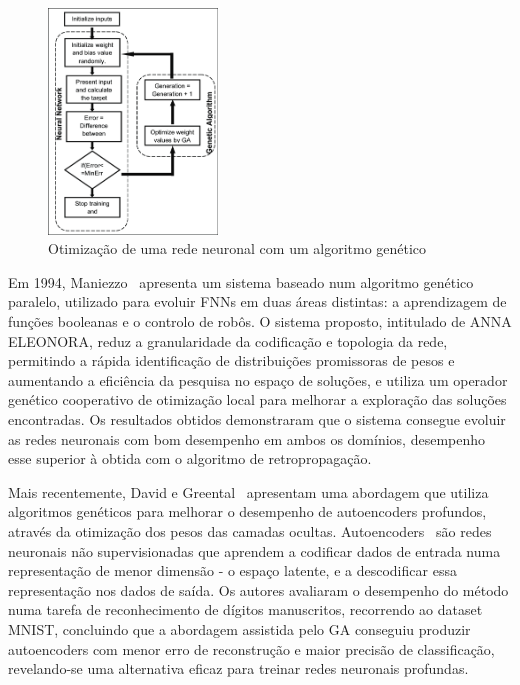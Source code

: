 \begin{figure}[htbp]
    \centering
    \includegraphics[width=0.4\textwidth]{imagens/ga_nn}
    \caption{Otimização de uma rede neuronal com um algoritmo genético~\cite{Rahman2015AnAlgorithms}}
    \label{fig:ga_nn}
\end{figure}

Em 1994, Maniezzo~\cite{Maniezzo1994} apresenta um sistema baseado num algoritmo genético paralelo, utilizado para evoluir FNNs em duas áreas distintas: a aprendizagem de funções booleanas e o controlo de robôs.
O sistema proposto, intitulado de ANNA ELEONORA, reduz a granularidade da codificação e topologia da rede, permitindo a rápida identificação de distribuições promissoras de pesos e aumentando a eficiência da pesquisa no espaço de soluções, e utiliza um operador genético cooperativo de otimização local para melhorar a exploração das soluções encontradas.
Os resultados obtidos demonstraram que o sistema consegue evoluir as redes neuronais com bom desempenho em ambos os domínios, desempenho esse superior à obtida com o algoritmo de retropropagação.

Mais recentemente, David e Greental~\cite{David2014GeneticNetworks} apresentam uma abordagem que utiliza algoritmos genéticos para melhorar o desempenho de autoencoders profundos, através da otimização dos pesos das camadas ocultas.
Autoencoders~\cite{Pierre2011} são redes neuronais não supervisionadas que aprendem a codificar dados de entrada numa representação de menor dimensão - o espaço latente, e a descodificar essa representação nos dados de saída.
Os autores avaliaram o desempenho do método numa tarefa de reconhecimento de dígitos manuscritos, recorrendo ao dataset MNIST, concluindo que a abordagem assistida pelo GA conseguiu produzir autoencoders com menor erro de reconstrução e maior precisão de classificação, revelando-se uma alternativa eficaz para treinar redes neuronais profundas.